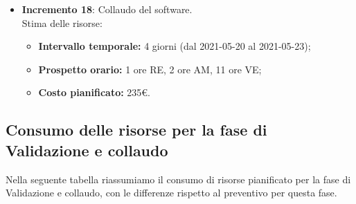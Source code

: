 \begin{itemize}
\item \textbf{Incremento 18}:
Collaudo del software.\\
Stima delle risorse:
\begin{itemize}
	\item \textbf{Intervallo temporale:} 4 giorni (dal 2021-05-20 al 2021-05-23);
	\item \textbf{Prospetto orario:} 1 ore RE, 2 ore AM, 11 ore VE;
	\item \textbf{Costo pianificato:} 235€.
\end{itemize}

\end{itemize}

\clearpage
\subsection{Consumo delle risorse per la fase di Validazione e collaudo}

Nella seguente tabella riassumiamo il consumo di risorse pianificato per la fase di Validazione e collaudo, con le differenze rispetto al preventivo per questa fase.

